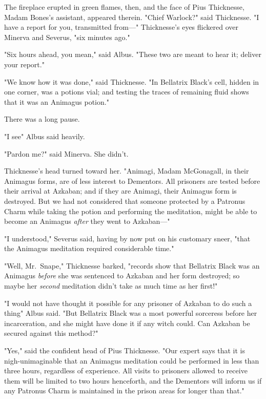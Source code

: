 The fireplace erupted in green flames, then, and the face of Pius Thicknesse,
Madam Bones's assistant, appeared therein. "Chief Warlock?" said Thicknesse. "I
have a report for you, transmitted from\mbox{---}" Thicknesse's eyes flickered over
Minerva and Severus, "six minutes ago."

"Six hours ahead, you mean," said Albus. "These two are meant to hear it;
deliver your report."

"We know how it was done," said Thicknesse. "In Bellatrix Black's cell, hidden
in one corner, was a potions vial; and testing the traces of remaining fluid
shows that it was an Animagus potion."

There was a long pause.

"I see{\el}" Albus said heavily.

"Pardon me?" said Minerva. She didn't.

Thicknesse's head turned toward her. "Animagi, Madam McGonagall, in their
Animagus forms, are of less interest to Dementors. All prisoners are tested
before their arrival at Azkaban; and if they are Animagi, their Animagus form
is destroyed. But we had not considered that someone protected by a Patronus
Charm while taking the potion and performing the meditation, might be able to
become an Animagus \emph{after} they went to Azkaban\mbox{---}"

"I understood," Severus said, having by now put on his customary sneer, "that
the Animagus meditation required considerable time."

"Well, Mr.~Snape," Thicknesse barked, "records show that Bellatrix Black was an
Animagus \emph{before} she was sentenced to Azkaban and her form destroyed; so
maybe her \emph{second} meditation didn't take as much time as her first!"

"I would not have thought it possible for any prisoner of Azkaban to do such a
thing{\el}" Albus said. "But Bellatrix Black was a most powerful sorceress
before her incarceration, and she might have done it if any witch could. Can
Azkaban be secured against this method?"

"Yes," said the confident head of Pius Thicknesse. "Our expert says that it is
nigh-unimaginable that an Animagus meditation could be performed in less than
three hours, regardless of experience. All visits to prisoners allowed to
receive them will be limited to two hours henceforth, and the Dementors will
inform us if any Patronus Charm is maintained in the prison areas for longer
than that."


